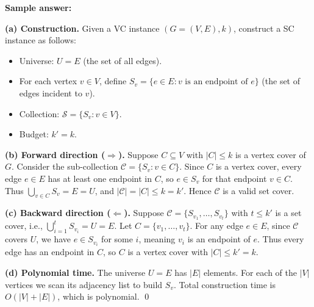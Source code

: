 \documentclass[11pt]{article}
\begin{document}
\begin{enumerate}[leftmargin=0pt, itemindent=1.7em, itemsep=1.2em]
\vspace{7.0cm}

\ifanswers
\textbf{Sample answer:}

\textbf{(a) Construction.} Given a VC instance $(G=(V,E), k)$, construct a SC instance as follows:
\begin{itemize}
	\item Universe: $U = E$ (the set of all edges).
	\item For each vertex $v \in V$, define $S_v = \{ e \in E : v \text{ is an endpoint of } e \}$ (the set of edges incident to $v$).
	\item Collection: $\mathcal{S} = \{ S_v : v \in V \}$.
	\item Budget: $k' = k$.
\end{itemize}

\textbf{(b) Forward direction ($\Rightarrow$).} Suppose $C \subseteq V$ with $|C| \le k$ is a vertex cover of $G$. Consider the sub-collection $\mathcal{C} = \{ S_v : v \in C \}$. Since $C$ is a vertex cover, every edge $e \in E$ has at least one endpoint in $C$, so $e \in S_v$ for that endpoint $v \in C$. Thus $\bigcup_{v \in C} S_v = E = U$, and $|\mathcal{C}| = |C| \le k = k'$. Hence $\mathcal{C}$ is a valid set cover.

\textbf{(c) Backward direction ($\Leftarrow$).} Suppose $\mathcal{C} = \{S_{v_1}, \ldots, S_{v_t}\}$ with $t \le k'$ is a set cover, i.e., $\bigcup_{i=1}^{t} S_{v_i} = U = E$. Let $C = \{v_1, \ldots, v_t\}$. For any edge $e \in E$, since $\mathcal{C}$ covers $U$, we have $e \in S_{v_i}$ for some $i$, meaning $v_i$ is an endpoint of $e$. Thus every edge has an endpoint in $C$, so $C$ is a vertex cover with $|C| \le k' = k$.

\textbf{(d) Polynomial time.} The universe $U = E$ has $|E|$ elements. For each of the $|V|$ vertices we scan its adjacency list to build $S_v$. Total construction time is $O(|V| + |E|)$, which is polynomial. \qed
\fi

\end{enumerate}
\end{document}
